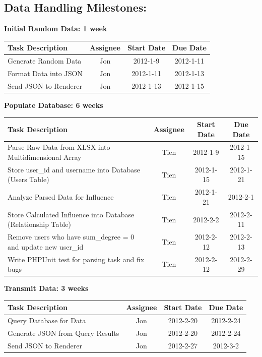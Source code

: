 \documentclass[12pt, letterpaper]{article}
\begin{document}
  	\subsection{Data Handling Milestones:}

  \begin{center}
		{\bf Initial Random Data: 1 week}
    \begin{tabular}{| p{8.3cm} || c | c | c | }
      \hline
      Task Description & Assignee & Start Date & Due Date \\
      \hline
	    Generate Random Data & Jon & 2012-1-9 & 2012-1-11 \\
	    Format Data into JSON & Jon & 2012-1-11 & 2012-1-13 \\
	    Send JSON to Renderer & Jon & 2012-1-13 & 2012-1-15 \\
      \hline
    \end{tabular}
  \end{center}

  \begin{center}
		{\bf Populate Database: 6 weeks}
    \begin{tabular}{| p{8.3cm} || c | c | c | }
      \hline
      Task Description & Assignee & Start Date & Due Date \\
      \hline
	    Parse Raw Data from XLSX into Multidimensional Array & Tien & 2012-1-9 & 2012-1-15 \\
        Store user\_id and username into Database (Users Table) & Tien & 2012-1-15 & 2012-1-21 \\
	    Analyze Parsed Data for Influence & Tien & 2012-1-21 & 2012-2-1 \\
        Store Calculated Influence into Database (Relationship Table) & Tien & 2012-2-2 & 2012-2-11 \\
        Remove users who have sum\_degree = 0 and update new user\_id & Tien & 2012-2-12 & 2012-2-13 \\
		Write PHPUnit test for parsing task and fix bugs & Tien & 2012-2-12 & 2012-2-29 \\
      \hline
    \end{tabular}
  \end{center}

  \begin{center}
		{\bf Transmit Data: 3 weeks}
    \begin{tabular}{| p{8.3cm} || c | c | c | }
      \hline
      Task Description & Assignee & Start Date & Due Date \\
      \hline
	    Query Database for Data & Jon & 2012-2-20 & 2012-2-24 \\
	    Generate JSON from Query Results & Jon & 2012-2-20 & 2012-2-24 \\
	    Send JSON to Renderer & Jon & 2012-2-27 & 2012-3-2 \\
      \hline
    \end{tabular}
  \end{center}
  
\end{document}
